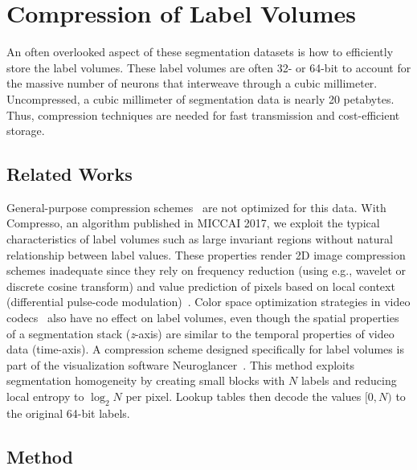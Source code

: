 \section{Compression of Label Volumes}

An often overlooked aspect of these segmentation datasets is how to efficiently store the label volumes.
These label volumes are often 32- or 64-bit to account for the massive number of neurons that interweave through a cubic millimeter.
Uncompressed, a cubic millimeter of segmentation data is nearly 20 petabytes.
Thus, compression techniques are needed for fast transmission and cost-efficient storage.

\subsection{Related Works}

General-purpose compression schemes~\cite{collet2016smaller,deutsch1996zlib,google2016brotli,lehmann2016liblzf,oberhumer2005lzo,pavlov2007lzma,seward1998bzip2,vandevenne2016zopfli,welch1984technique,ziv1978compression} are not optimized for this data.
With Compresso, an algorithm published in MICCAI 2017, we exploit the typical characteristics of label volumes such as large invariant regions without natural relationship between label values. 
These properties render 2D image compression schemes inadequate since they rely on frequency reduction (using e.g., wavelet or discrete cosine transform) and value prediction of pixels based on local context (differential pulse-code modulation)~\cite{roelofs1999png,skodras2001jpeg}. 
Color space optimization strategies in video codecs~\cite{aimar2005x264} also have no effect on label volumes, even though the spatial properties of a segmentation stack (\textit{z}-axis) are similar to the temporal properties of video data (time-axis). 
A compression scheme designed specifically for label volumes is part of the visualization software Neuroglancer~\cite{google2016compressed}. 
This method exploits segmentation homogeneity by creating small blocks with $N$ labels and reducing local entropy to $\log_2{N}$ per pixel. 
Lookup tables then decode the values $[0,N)$ to the original 64-bit labels.

\subsection{Method}


